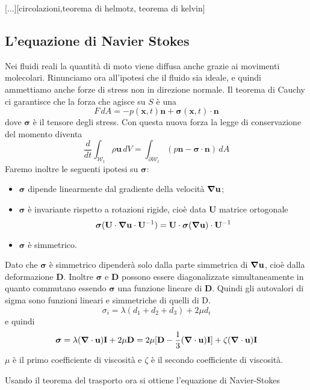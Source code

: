[...][circolazioni,teorema di helmotz, teorema di kelvin]

\subsection{L'equazione di Navier Stokes}
Nei fluidi reali la quantità di moto viene diffusa anche grazie ai movimenti molecolari.
Rinunciamo ora all'ipotesi che il fluido sia ideale, e quindi ammettiamo anche forze di stress non in direzione normale.
Il teorema di Cauchy ci garantisce che la forza che agisce su $S$ è una 
$$F \, dA = -p(\mathbf{x},t) \mathbf{n} + \boldsymbol{\sigma}(\mathbf{x},t) \cdot \mathbf{n}$$
dove $\boldsymbol{\sigma}$ è il tensore degli stress.
Con questa nuova forza la legge di conservazione del momento diventa
$$\frac{d}{dt} \int_{\mathcal{W}_t} \rho \mathbf{u} \, dV = \int_{\partial \mathcal{W}_t} (p \mathbf{n} - \boldsymbol{\sigma} \cdot \mathbf{n} )\, dA$$
Faremo inoltre le seguenti ipotesi su $\boldsymbol{\sigma}$: \begin{itemize}
  \item $\boldsymbol{\sigma}$ dipende linearmente dal gradiente della velocità $\boldsymbol{\nabla} \mathbf{u}$;
  \item $\boldsymbol{\sigma}$ è invariante rispetto a rotazioni rigide, cioè data $\mathbf{U}$ matrice ortogonale
$$\boldsymbol{\sigma}(\mathbf{U} \cdot \boldsymbol{\nabla} \mathbf{u} \cdot \mathbf{U}^{-1}) = \mathbf{U} \cdot \boldsymbol{\sigma}( \boldsymbol{\nabla} \mathbf{u} ) \cdot \mathbf{U}^{-1}$$
\item $\boldsymbol{\sigma}$ è simmetrico.
\end{itemize} 

Dato che $\boldsymbol{\sigma}$ è simmetrico dipenderà solo dalla parte simmetrica di $\boldsymbol{\nabla} \mathbf{u}$, cioè dalla deformazione $\mathbf{D}$. Inoltre $\boldsymbol{\sigma}$ e $\mathbf{D}$ possono essere diagonalizzate simultaneamente in quanto commutano essendo $\boldsymbol{\sigma}$ una funzione lineare di $\mathbf{D}$.
Quindi gli autovalori di sigma sono funzioni lineari e simmetriche di quelli di D.
$$\sigma_i = \lambda (d_1 + d_2 + d_3) +2 \mu d_i$$
e quindi 
$$\boldsymbol{\sigma} = \lambda ( \boldsymbol{\nabla}\cdot \mathbf{u}) \mathbf{I} + 2 \mu \mathbf{D}
                                     = 2 \mu [ \mathbf{D} - \frac{1}{3} ( \boldsymbol{\nabla}\cdot \mathbf{u}) \mathbf{I} ] + \zeta ( \boldsymbol{\nabla}\cdot \mathbf{u})  \mathbf{I}
$$
$\mu$ è il primo coefficiente di viscosità e $\zeta$ è il secondo coefficiente di viscosità.

Usando il teorema del trasporto ora si ottiene l'equazione di Navier-Stokes


